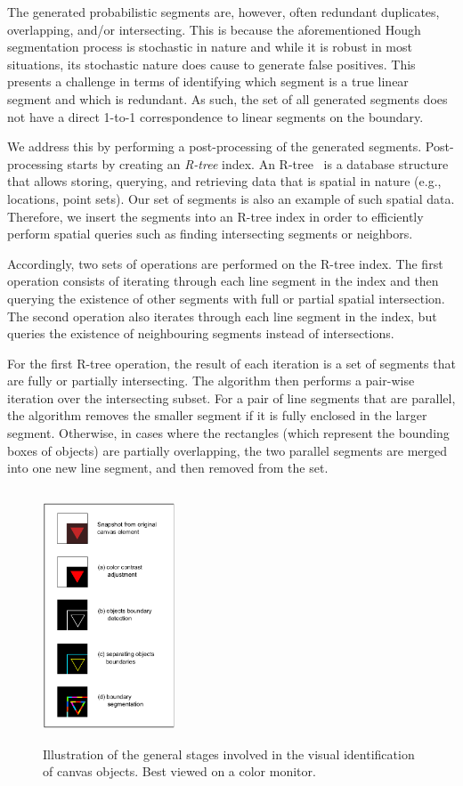 The generated probabilistic segments are, however, often redundant duplicates, overlapping, and/or intersecting. 
This is because the aforementioned Hough segmentation process is stochastic in nature and while it is robust in most situations, its stochastic nature does cause to generate false positives. 
This presents a challenge in terms of identifying which segment is a true linear segment and which is redundant. 
As such, the set of all generated segments does not have a direct 1-to-1 correspondence to linear segments on the boundary.

We address this by performing a post-processing of the generated segments. Post-processing starts by creating an \emph{R-tree} index. An R-tree~\cite{hadjieleftheriou2008r} is a database structure that allows storing, querying, and retrieving data that is spatial in nature (e.g., locations, point sets). Our set of segments is also an example of such spatial data. Therefore, we insert the segments into an R-tree index in order to efficiently perform spatial queries such as finding intersecting segments or neighbors.
 
Accordingly, two sets of operations are performed on the R-tree index. The first operation consists of iterating through each line segment in the index and then querying the existence of other segments with full or partial spatial intersection. The second operation also iterates through each line segment in the index, but queries the existence of neighbouring segments instead of intersections.

For the first R-tree operation, the result of each iteration is a set of segments that are fully or partially intersecting. The algorithm then performs a pair-wise iteration over the intersecting subset. For a pair of line segments that are parallel, the algorithm removes the smaller segment if it is fully enclosed in the larger segment. Otherwise, in cases where the rectangles (which represent the bounding boxes of objects) are partially overlapping, the two parallel segments are merged into one new line segment, and then removed from the set.

\begin{figure}%
    \centering
    \includegraphics[trim={0.0cm 0.0cm 0.0cm 0.0cm},clip,height=7.5cm,width=0.35\textwidth]{testability/figures/stages-illustration.png}
    \caption{Illustration of the general stages involved in the visual identification of canvas objects. Best viewed on a color monitor. }
    \label{fig:stages-examples}
\end{figure}


